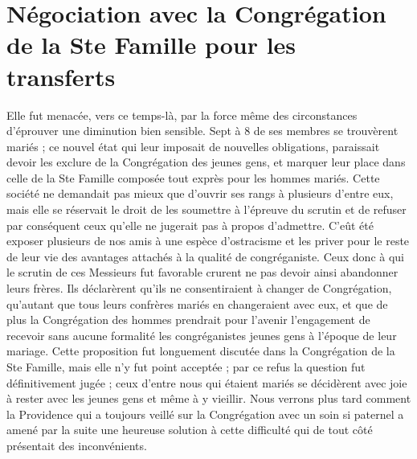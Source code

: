 \section*{Négociation avec la Congrégation de la Ste Famille pour les transferts}
Elle fut menacée, vers ce temps-là, par la force même des circonstances d'éprouver une diminution bien sensible. Sept à 8 de ses membres se trouvèrent mariés ; ce nouvel état qui leur imposait de nouvelles obligations, paraissait devoir les exclure de la Congrégation des jeunes gens, et marquer leur place dans celle de la Ste Famille composée tout exprès pour les hommes mariés. Cette société ne demandait pas mieux que d'ouvrir ses rangs à plusieurs d'entre eux, mais elle se réservait le droit de les soumettre à l'épreuve du scrutin et de refuser par conséquent ceux qu'elle ne jugerait pas à propos d'admettre. C'eût été exposer plusieurs de nos amis à une espèce d'ostracisme et les priver pour le reste de leur vie des avantages attachés à la qualité de congréganiste. Ceux donc à qui le scrutin de ces Messieurs fut favorable crurent ne pas devoir ainsi abandonner leurs frères. Ils déclarèrent qu'ils ne consentiraient à changer de Congrégation, qu'autant que tous leurs confrères mariés en changeraient avec eux, et que de plus la Congrégation des hommes prendrait pour l'avenir l'engagement de recevoir sans aucune formalité les congréganistes jeunes gens à l'époque de leur mariage. Cette proposition fut longuement discutée dans la Congrégation de la Ste Famille, mais elle n'y fut point acceptée ; par ce refus la question fut définitivement jugée ; ceux d'entre nous qui étaient mariés se décidèrent avec joie à rester avec les jeunes gens et même à y vieillir. Nous verrons plus tard comment la Providence qui a toujours veillé sur la Congrégation avec un soin si paternel a amené par la suite
une heureuse solution à cette difficulté qui de tout côté présentait des inconvénients.

